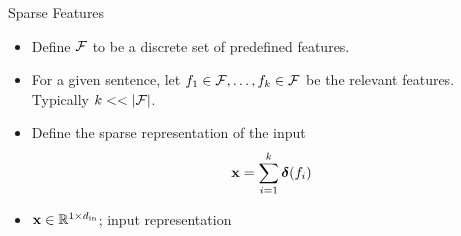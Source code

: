 \documentclass{beamer}
\begin{document}
\begin{frame}{Sparse Features}
  \begin{itemize}
  \item   Define $\mathcal{F}$ to be a discrete set of predefined features. 
  \item   For a given sentence, let $f_1\in\mathcal{F}, \ldots , f_k\in\mathcal{F}$ be the relevant features. 
    Typically $k << |\mathcal{F}|$.
  \item Define the sparse representation of the input
    \[\mathbf{x} = \sum_{i=1}^k \boldsymbol{\delta}(f_i) \]
  \item $\mathbf{x} \in \mathbb{R}^{1\times {d_{\mathrm{in}}}}$; input representation 
  \end{itemize}

\end{frame}
\end{document}
